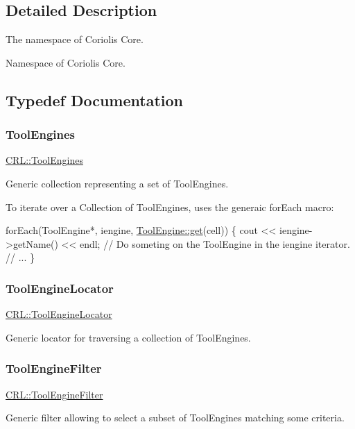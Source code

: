 \subsection{Detailed Description}
The namespace of Coriolis Core. 

Namespace of Coriolis Core. 

\subsection{Typedef Documentation}
\mbox{\label{namespaceCRL_ae49bc0c5f113bba964680768556dd1b3}} 
\subsubsection{\texorpdfstring{Tool\+Engines}{ToolEngines}}
{\footnotesize\ttfamily \mbox{\hyperlink{namespaceCRL_ae49bc0c5f113bba964680768556dd1b3}{C\+R\+L\+::\+Tool\+Engines}}}

Generic collection representing a set of Tool\+Engines.

To iterate over a Collection of Tool\+Engines, uses the generaic {\ttfamily for\+Each} macro\+: 
\begin{DoxyCode}
forEach(ToolEngine*, iengine, \mbox{\hyperlink{classCRL_1_1ToolEngine_afb78e8f180ecc36ff8fa4e91e7885d37}{ToolEngine::get}}(cell)) \{
  cout << iengine->getName() << endl;
  \textcolor{comment}{// Do someting on the ToolEngine in the iengine iterator.}
  \textcolor{comment}{// ...}
\}
\end{DoxyCode}
 \mbox{\label{namespaceCRL_a9c6426dc361a7b02fc55b7c19401c7aa}} 
\subsubsection{\texorpdfstring{Tool\+Engine\+Locator}{ToolEngineLocator}}
{\footnotesize\ttfamily \mbox{\hyperlink{namespaceCRL_a9c6426dc361a7b02fc55b7c19401c7aa}{C\+R\+L\+::\+Tool\+Engine\+Locator}}}

Generic locator for traversing a collection of Tool\+Engines. \mbox{\label{namespaceCRL_a976ed6ed06b1c3510c696de4c8960971}} 
\subsubsection{\texorpdfstring{Tool\+Engine\+Filter}{ToolEngineFilter}}
{\footnotesize\ttfamily \mbox{\hyperlink{namespaceCRL_a976ed6ed06b1c3510c696de4c8960971}{C\+R\+L\+::\+Tool\+Engine\+Filter}}}

Generic filter allowing to select a subset of Tool\+Engines matching some criteria. 